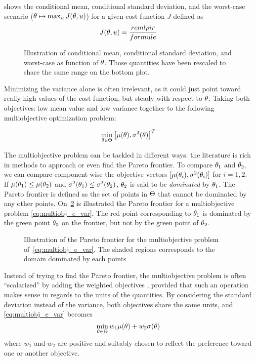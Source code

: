 \documentclass[../../Main_ManuscritThese.tex]{subfiles}
\newcommand\imgpath{/home/victor/acadwriting/Manuscrit/Text/Chapter3/img/}
\begin{document}
 shows the conditional mean, conditional standard deviation, and the worst-case scenario ($\theta \mapsto \max_{u} J(\theta,u)$) for a given cost function $J$ defined as
\begin{equation}
  J(\theta,u) = \frac{remlpir}{formule}
\end{equation}
\begin{figure}[ht]
  \centering
  
  \caption{Illustration of conditional mean, conditional standard deviation, and worst-case as function of $\theta$. Those quantities have been rescaled to share the same range on the bottom plot.}
  \label{fig:mean_std_wc} 
\end{figure}



Minimizing the variance alone is often irrelevant, as it could just point toward really high values of the cost function, but steady with respect to  $\theta$. Taking both objectives: low mean value and low variance together to the following multiobjective optimization problem:

\begin{align}
  \label{eq:multiobj_e_var}
  \min_{\theta\in\Theta} \left[\mu(\theta),\sigma^2(\theta)\right]^T
\end{align}

The multiobjective problem can be tackled in different ways: the literature is rich in methods to approach or even find the Pareto frontier. To compare $\theta_1$ and $\theta_2$, we can compare component wise the objective vectors $[\mu(\theta_i),\sigma^2(\theta_i)]$ for $i=1,2$. If $\mu(\theta_1) \leq \mu(\theta_2)$ and $\sigma^2(\theta_1) \leq \sigma^2(\theta_2)$, $\theta_2$ is said to be \emph{dominated} by $\theta_1$. The Pareto frontier is defined as the set of points in $\Theta$ that cannot be dominated by any other points.
On~\cref{fig:pareto} is illustrated the Pareto frontier for a multiobjective problem \cref{eq:multiobj_e_var}. The red point corresponding to $\theta_1$ is dominated by the green point $\theta_0$ on the frontier, but not by the green point of $\theta_2$.

\begin{figure}[ht]
  \label{fig:pareto} 
  \centering
  
  \caption{Illustration of the Pareto frontier for the multiobjective problem of~\cref{eq:multiobj_e_var}. The shaded regions corresponds to the domain dominated by each points}
\end{figure}

Instead of trying to find the Pareto frontier, the multiobjective problem is often ``scalarized'' by adding the weighted objectives \cite{marler_weighted_2010}, provided that such an operation makes sense in regards to the units of the quantities. By considering the standard deviation instead of the variance, both objectives share the same units, and \cref{eq:multiobj_e_var} becomes
\begin{equation}
  \min_{\theta\in\Theta} w_1\mu(\theta) + w_2\sigma(\theta)
\end{equation}
where $w_1$ and $w_2$ are positive and suitably chosen to reflect the preference toward one or another objective.
\end{document}

